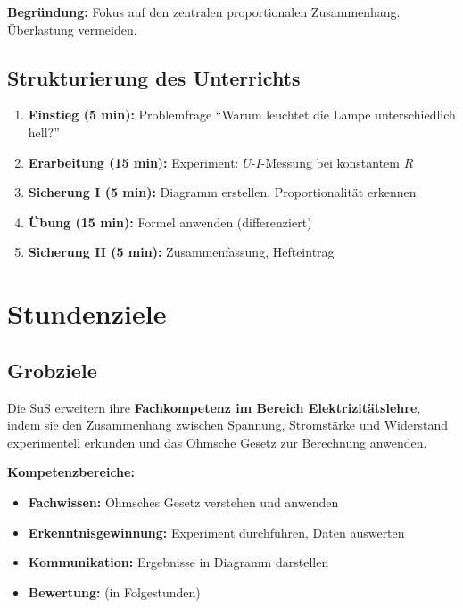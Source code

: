 \documentclass[11pt,a4paper]{article}
\begin{document}
\textbf{Begründung:} Fokus auf den zentralen proportionalen Zusammenhang. Überlastung vermeiden.

\subsection{Strukturierung des Unterrichts}
\begin{enumerate}
    \item \textbf{Einstieg (5 min):} Problemfrage ``Warum leuchtet die Lampe unterschiedlich hell?''
    \item \textbf{Erarbeitung (15 min):} Experiment: $U$-$I$-Messung bei konstantem $R$
    \item \textbf{Sicherung I (5 min):} Diagramm erstellen, Proportionalität erkennen
    \item \textbf{Übung (15 min):} Formel anwenden (differenziert)
    \item \textbf{Sicherung II (5 min):} Zusammenfassung, Hefteintrag
\end{enumerate}

\section{Stundenziele}

\subsection{Grobziele}
Die SuS erweitern ihre \textbf{Fachkompetenz im Bereich Elektrizitätslehre}, indem sie den Zusammenhang zwischen Spannung, Stromstärke und Widerstand experimentell erkunden und das Ohmsche Gesetz zur Berechnung anwenden.

\textbf{Kompetenzbereiche:}
\begin{itemize}
    \item \textbf{Fachwissen:} Ohmsches Gesetz verstehen und anwenden
    \item \textbf{Erkenntnisgewinnung:} Experiment durchführen, Daten auswerten
    \item \textbf{Kommunikation:} Ergebnisse in Diagramm darstellen
    \item \textbf{Bewertung:} (in Folgestunden)
\end{itemize}
\end{document}
